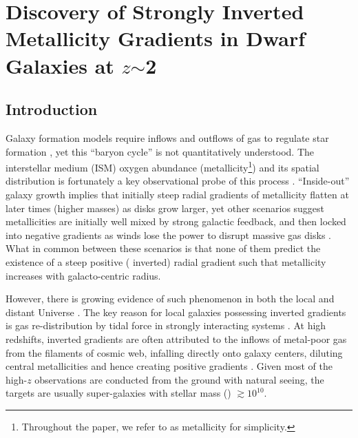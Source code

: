 
\chapter{Discovery of Strongly Inverted Metallicity Gradients in Dwarf Galaxies at $z$$\sim$2}

\section{Introduction}\label{sect:intro}

Galaxy formation models require inflows and outflows of gas to regulate star formation 
\citep{2008MNRAS.385.2181F,Recchi:2008gw,Bouche:2010kh,2012MNRAS.421...98D,Dayal:2013im,Dekel:2013id,Lilly:2013ko,Dekel:2014jm,Peng:2014hn,Pipino:2014it}, 
yet this ``baryon cycle'' is not quantitatively understood. The interstellar medium (ISM) oxygen abundance 
(\ie metallicity\footnote{Throughout the paper, we refer to \gpm as metallicity for simplicity.}) and its 
spatial distribution
is fortunately a key observational probe of this process
\citep{Tremonti:2004ed,Erb:2006kn,2008A&A...488..463M,Bresolin:2009hh,2010MNRAS.408.2115M,Mannucci:2011be,Zahid:2011bb,Yates:2012kx,Zahid:2012cd,
Henry:2013cn,2013ApJ...765...48J,2014A&A...563A..49S,TheUniversalRelati:2014kx,Bresolin:2015fk,Ho:2015gq,Sanders:2015gk,Strom:2016vn}.
``Inside-out'' galaxy growth implies that initially steep radial gradients of metallicity flatten at later 
times (higher masses)
as disks grow larger, yet other scenarios suggest metallicities are initially well mixed by strong galactic feedback, and then
locked into negative gradients as winds lose the power to disrupt massive gas disks
\citep{Prantzos:2000gb,Hou:2000tq,Molla:2005eq,Kobayashi:2011cr,Few:2012jl,Pilkington:2012ib,Gibson:2013jw,2017MNRAS.466.4780M}.
What in common between these scenarios is that none of them predict the existence of a steep positive (\ie 
inverted) radial gradient such that metallicity increases with galacto-centric radius.

However, there is growing evidence of such phenomenon in both the local and distant Universe
\citep{Cresci:2010hr,Queyrel:2012hw,2014MNRAS.443.2695S,Metallicityevolutio:2014kg,2014A&A...563A..49S,PerezMontero:2016hs,2016ApJ...827...74W,Belfiore:2017bv,Carton:2018kv}.
The key reason for local galaxies possessing inverted gradients is gas re-distribution by tidal force in strongly interacting
systems \citep{Kewley:2006gb,Kewley:2010eg,Rupke:2010cg,AnIntegralFieldSt:2012hn,Torrey:2012kf}.
At high redshifts, inverted gradients are often attributed to the inflows of metal-poor gas from the filaments of cosmic web,
infalling directly onto galaxy centers, diluting central metallicities and hence creating positive gradients
\citep{Cresci:2010hr,Mott:2013bt}.
Given most of the high-$z$ observations are conducted from the ground with natural seeing, the targets are usually
super-\Lstar galaxies with stellar mass (\Mstar) $\gtrsim$$10^{10}$\Msun \citep[see \eg,][]{Metallicityevolutio:2014kg}.

